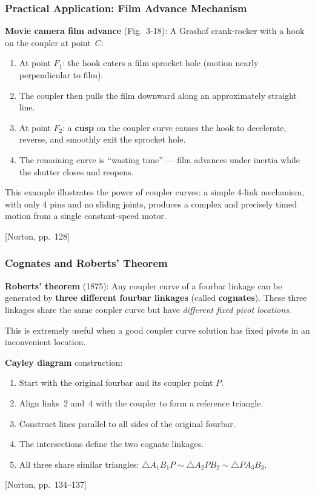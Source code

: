 \documentclass[10pt,aspectratio=43]{beamer}
\newcommand{\pref}[1]{\vfill\hfill{\scriptsize\color{gray}[Norton, pp.~#1]}}
\begin{document}
\begin{frame}
\frametitle{Practical Application: Film Advance Mechanism}

\textbf{Movie camera film advance} (Fig.~3-18): A Grashof crank-rocker with a hook on the coupler at point~$C$:

\begin{enumerate}
  \item At point $F_1$: the hook enters a film sprocket hole (motion nearly perpendicular to film).
  \item The coupler then pulls the film downward along an approximately straight line.
  \item At point $F_2$: a \textbf{cusp} on the coupler curve causes the hook to decelerate, reverse, and smoothly exit the sprocket hole.
  \item The remaining curve is ``wasting time'' --- film advances under inertia while the shutter closes and reopens.
\end{enumerate}

\vspace{4pt}
\begin{greenbox}
This example illustrates the power of coupler curves: a simple 4-link mechanism, with only 4 pins and no sliding joints, produces a complex and precisely timed motion from a single constant-speed motor.
\end{greenbox}
\pref{128}
\end{frame}


\begin{frame}
\frametitle{Cognates and Roberts' Theorem}

\begin{yellowbox}
\textbf{Roberts' theorem} (1875): Any coupler curve of a fourbar linkage can be generated by \textbf{three different fourbar linkages} (called \textbf{cognates}). These three linkages share the same coupler curve but have \emph{different fixed pivot locations}.
\end{yellowbox}

\vspace{4pt}
This is extremely useful when a good coupler curve solution has fixed pivots in an inconvenient location.

\vspace{6pt}
\textbf{Cayley diagram} construction:
\begin{enumerate}
  \item Start with the original fourbar and its coupler point $P$.
  \item Align links~2 and~4 with the coupler to form a reference triangle.
  \item Construct lines parallel to all sides of the original fourbar.
  \item The intersections define the two cognate linkages.
  \item All three share similar triangles: $\triangle A_1B_1P \sim \triangle A_2PB_2 \sim \triangle PA_3B_3$.
\end{enumerate}
\pref{134--137}
\end{frame}
\end{document}
